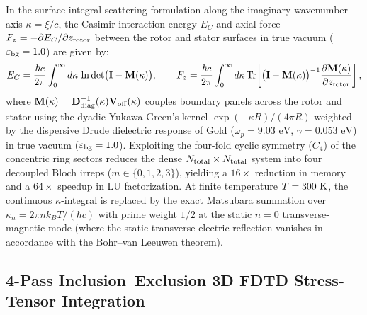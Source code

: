 \documentclass[11pt,letterpaper]{article}
\begin{document}
In the surface-integral scattering formulation along the imaginary wavenumber axis $\kappa = \xi/c$, the Casimir interaction energy $E_C$ and axial force $F_z = -\partial E_C / \partial z_{\rm rotor}$ between the rotor and stator surfaces in true vacuum ($\varepsilon_{\rm bg}=1.0$) are given by:
\begin{equation}
E_C = \frac{\hbar c}{2\pi} \int_0^\infty d\kappa \, \ln\det\bigl(\mathbf{I} - \mathbf{M}(\kappa)\bigr),
\qquad
F_z = \frac{\hbar c}{2\pi} \int_0^\infty d\kappa \, \mathrm{Tr}\!\left[\bigl(\mathbf{I} - \mathbf{M}(\kappa)\bigr)^{-1} \frac{\partial \mathbf{M}(\kappa)}{\partial z_{\rm rotor}}\right],
\label{eq:bem_logdet_force}
\end{equation}
where $\mathbf{M}(\kappa) = \mathbf{D}_{\rm diag}^{-1}(\kappa)\mathbf{V}_{\rm off}(\kappa)$ couples boundary panels across the rotor and stator using the dyadic Yukawa Green's kernel $\exp(-\kappa R)/(4\pi R)$ weighted by the dispersive Drude dielectric response of Gold ($\omega_p = 9.03\text{ eV}$, $\gamma = 0.053\text{ eV}$) in true vacuum ($\varepsilon_{\rm bg}=1.0$). Exploiting the four-fold cyclic symmetry ($C_4$) of the concentric ring sectors reduces the dense $N_{\rm total} \times N_{\rm total}$ system into four decoupled Bloch irreps ($m \in \{0, 1, 2, 3\}$), yielding a $16\times$ reduction in memory and a $64\times$ speedup in LU factorization. At finite temperature $T = 300{}\text{ K}$, the continuous $\kappa$-integral is replaced by the exact Matsubara summation over $\kappa_n = 2\pi n k_B T / (\hbar c)$ with prime weight $1/2$ at the static $n=0$ transverse-magnetic mode (where the static transverse-electric reflection vanishes in accordance with the Bohr--van Leeuwen theorem).

\subsection{4-Pass Inclusion--Exclusion 3D FDTD Stress-Tensor Integration}
\end{document}
